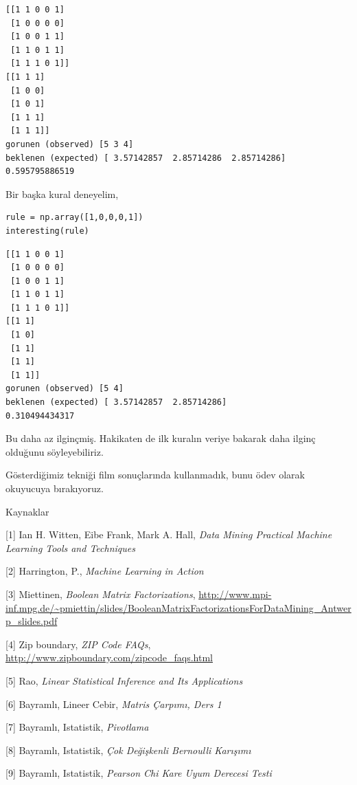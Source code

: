 \documentclass[12pt,fleqn]{article}\usepackage{../../common}
\begin{document}
\begin{verbatim}
[[1 1 0 0 1]
 [1 0 0 0 0]
 [1 0 0 1 1]
 [1 1 0 1 1]
 [1 1 1 0 1]]
[[1 1 1]
 [1 0 0]
 [1 0 1]
 [1 1 1]
 [1 1 1]]
gorunen (observed) [5 3 4]
beklenen (expected) [ 3.57142857  2.85714286  2.85714286]
0.595795886519
\end{verbatim}

Bir başka kural deneyelim, 

\begin{verbatim}
rule = np.array([1,0,0,0,1])
interesting(rule)
\end{verbatim}

\begin{verbatim}
[[1 1 0 0 1]
 [1 0 0 0 0]
 [1 0 0 1 1]
 [1 1 0 1 1]
 [1 1 1 0 1]]
[[1 1]
 [1 0]
 [1 1]
 [1 1]
 [1 1]]
gorunen (observed) [5 4]
beklenen (expected) [ 3.57142857  2.85714286]
0.310494434317
\end{verbatim}

Bu daha az ilginçmiş. Hakikaten de ilk kuralın veriye bakarak daha ilginç
olduğunu söyleyebiliriz. 

Gösterdiğimiz tekniği film sonuçlarında kullanmadık, bunu ödev olarak
okuyucuya bırakıyoruz.

Kaynaklar

[1] Ian H. Witten, Eibe Frank, Mark A. Hall, {\em Data Mining Practical Machine Learning Tools and Techniques}

[2] Harrington, P., {\em Machine Learning in Action}

[3] Miettinen, {\em Boolean Matrix Factorizations}, \url{http://www.mpi-inf.mpg.de/~pmiettin/slides/BooleanMatrixFactorizationsForDataMining_Antwerp_slides.pdf}

[4] Zip boundary, {\em ZIP Code FAQs}, \url{http://www.zipboundary.com/zipcode_faqs.html}

[5] Rao, {\em Linear Statistical Inference and Its Applications}

[6] Bayramlı, Lineer Cebir, {\em Matris Çarpımı, Ders 1}

[7] Bayramlı, Istatistik, {\em Pivotlama}

[8] Bayramlı, Istatistik, {\em Çok Değişkenli Bernoulli Karışımı}

[9] Bayramlı, Istatistik, {\em Pearson Chi Kare Uyum Derecesi Testi}
\end{document}
